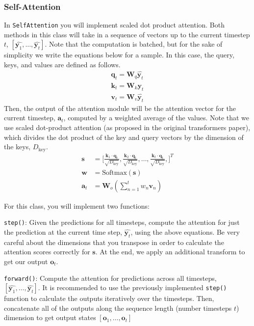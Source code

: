 \documentclass[11pt,addpoints,answers]{exam}
\newcommand{\av}{\mathbf{a}}
\newcommand{\kv}{\mathbf{k}}
\newcommand{\ov}{\mathbf{o}}
\newcommand{\qv}{\mathbf{q}}
\newcommand{\sv}{\mathbf{s}}
\newcommand{\vv}{\mathbf{v}}
\newcommand{\wv}{\mathbf{w}}
\newcommand{\yv}{\mathbf{y}}
\newcommand{\Wv}{\mathbf{W}}
\begin{document}
\subsubsection{Self-Attention}

 In \lstinline{SelfAttention} you will implement scaled dot product attention. Both methods in this class will take in a sequence of vectors up to the current timestep $t$, $[\hat{\yv_1}, \ldots, \hat{\yv_t}]$. Note that the computation is batched, but for the sake of simplicity we write the equations below for a sample. In this case, the query, keys, and values are defined as follows.
\begin{align*}
\qv_t = \Wv_q \hat{\yv_t} \\
\kv_t = \Wv_k \hat{\yv_t}\\
\vv_t = \Wv_v \hat{\yv_t}
\end{align*}
Then, the output of the attention module will be the attention vector for the current timestep, $\av_t$, computed by a weighted average of the values. Note that we use scaled dot-product attention (as proposed in the original transformers paper), which divides the dot product of the key and query vectors by the dimension of the keys, $D_\text{key}$.
\begin{align*}
    \sv &= \bigg[ \frac{\kv_1 \cdot \qv_t}{\sqrt{D_\text{key}}}, \frac{\kv_2 \cdot \qv_t}{\sqrt{D_\text{key}}}, \ldots, \frac{\kv_t \cdot \qv_t}{\sqrt{D_\text{key}}}, \bigg]^T \tag{Attention Scores} \\
    \wv &= \text{Softmax}(\sv) \tag{Attention Weights} \\
    \av_t &= \Wv_o \left(\sum_{n=1}^t w_n \vv_n\right)
\end{align*}

For this class, you will implement two functions:

\texttt{step()}: Given the predictions for all timesteps, compute the attention for just the prediction at the current time step, $\hat{\yv_t}$, using the above equations. Be very careful about the dimensions that you transpose in order to calculate the attention scores correctly for $\sv$. At the end, we apply an additional transform to get our output $\ov_t$.

\texttt{forward()}: Compute the attention for predictions across all timesteps, $[\hat{\yv_1}, \ldots, \hat{\yv_t}]$. It is recommended to use the previously implemented \texttt{step()} function to calculate the outputs iteratively over the timesteps. Then, concatenate all of the outputs along the sequence length (number timesteps $t$) dimension to get output states $[\ov_1, \ldots, \ov_t]$
\end{document}
